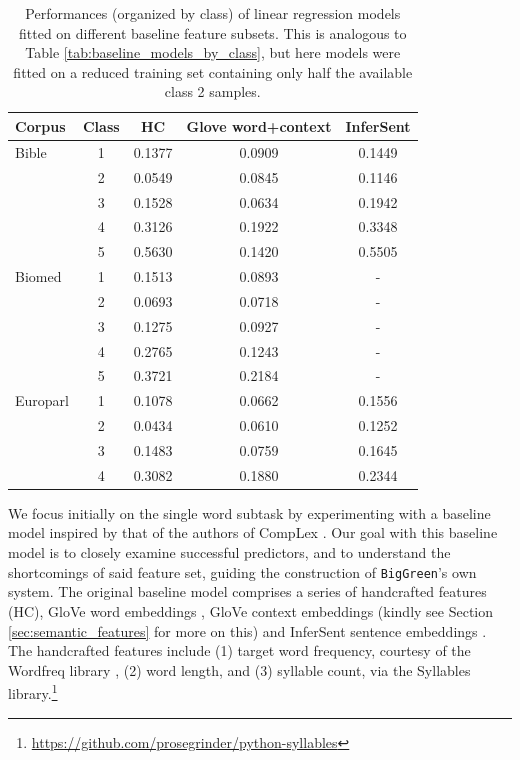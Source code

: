 \documentclass{dcthesis}
\theoremstyle{definition}
\theoremstyle{remark}
\begin{document}
\begin{table}
  \centering
  \begin{tabular}{l|c|c|c|c}
  \hline
  \textbf{Corpus} & \textbf{Class} & \textbf{HC} & \textbf{Glove word+context} & \textbf{InferSent} \\
  \hline
  Bible & 1 & 0.1377 & 0.0909 & 0.1449 \\
  & 2 & 0.0549 & 0.0845 & 0.1146 \\
  & 3 & 0.1528 & 0.0634 & 0.1942 \\
  & 4 & 0.3126 & 0.1922 & 0.3348 \\
  & 5 & 0.5630 & 0.1420 & 0.5505 \\
  \hline
  Biomed & 1 & 0.1513 & 0.0893 & - \\
  & 2 & 0.0693 & 0.0718 & - \\
  & 3 & 0.1275 & 0.0927 & - \\
  & 4 & 0.2765 & 0.1243 & - \\
  & 5 & 0.3721 & 0.2184 & - \\
  \hline
  Europarl & 1 & 0.1078 & 0.0662 & 0.1556 \\
  & 2 & 0.0434 & 0.0610 & 0.1252 \\
  & 3 & 0.1483 & 0.0759 & 0.1645 \\
  & 4 & 0.3082 & 0.1880 & 0.2344 \\
  \hline
  \end{tabular}
  \caption{\label{tab:baseline_models_by_class_reduced} 
  Performances (organized by class) of linear regression models fitted on different baseline feature subsets. This is analogous to Table \ref{tab:baseline_models_by_class}, but here models were fitted on a reduced training set containing only half the available class 2 samples.}
\end{table}

We focus initially on the single word subtask by experimenting with a baseline model inspired by that of the authors of CompLex \citep{shardlow2020complex}. Our goal with this baseline model is to closely examine successful predictors, and to understand the shortcomings of said feature set, guiding the construction of \texttt{BigGreen}'s own system. The original baseline model comprises a series of handcrafted features (HC), GloVe word embeddings \citep{pennington2014glove}, GloVe context embeddings (kindly see Section \ref{sec:semantic_features} for more on this) and InferSent sentence embeddings \citep{conneau2017supervised}. The handcrafted features include (1) target word frequency, courtesy of the Wordfreq library \citep{speer2018luminosoinsight}, (2) word length, and (3) syllable count, via the Syllables library.\footnote{\url{https://github.com/prosegrinder/python-syllables}} 
\end{document}
